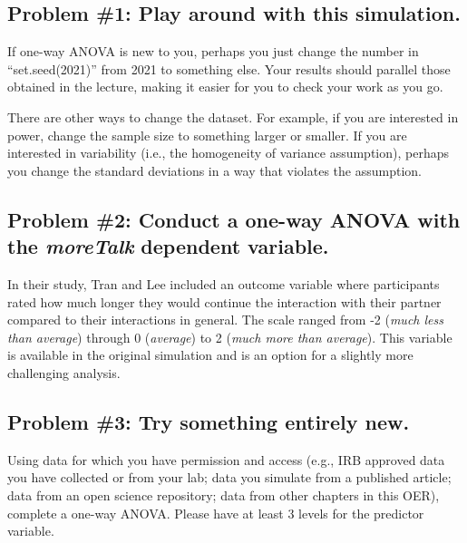 \documentclass[
  11pt,
]{book}
\begin{document}
\hypertarget{problem-1-play-around-with-this-simulation.}{%
\subsection{Problem \#1: Play around with this simulation.}\label{problem-1-play-around-with-this-simulation.}}

If one-way ANOVA is new to you, perhaps you just change the number in ``set.seed(2021)'' from 2021 to something else. Your results should parallel those obtained in the lecture, making it easier for you to check your work as you go.

There are other ways to change the dataset. For example, if you are interested in power, change the sample size to something larger or smaller. If you are interested in variability (i.e., the homogeneity of variance assumption), perhaps you change the standard deviations in a way that violates the assumption.

\hypertarget{problem-2-conduct-a-one-way-anova-with-the-moretalk-dependent-variable.}{%
\subsection{\texorpdfstring{Problem \#2: Conduct a one-way ANOVA with the \emph{moreTalk} dependent variable.}{Problem \#2: Conduct a one-way ANOVA with the moreTalk dependent variable.}}\label{problem-2-conduct-a-one-way-anova-with-the-moretalk-dependent-variable.}}

In their study, Tran and Lee \citeyearpar{tran_you_2014} included an outcome variable where participants rated how much longer they would continue the interaction with their partner compared to their interactions in general. The scale ranged from -2 (\emph{much less than average}) through 0 (\emph{average}) to 2 (\emph{much more than average}). This variable is available in the original simulation and is an option for a slightly more challenging analysis.

\hypertarget{problem-3-try-something-entirely-new.}{%
\subsection{Problem \#3: Try something entirely new.}\label{problem-3-try-something-entirely-new.}}

Using data for which you have permission and access (e.g., IRB approved data you have collected or from your lab; data you simulate from a published article; data from an open science repository; data from other chapters in this OER), complete a one-way ANOVA. Please have at least 3 levels for the predictor variable.
\end{document}
